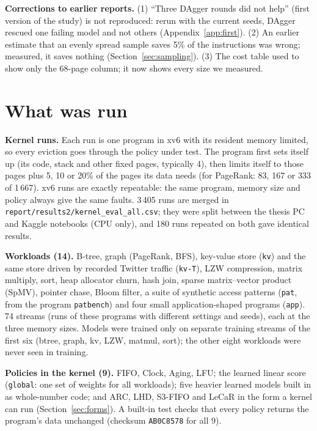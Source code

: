 \documentclass[10.5pt,a4paper]{article}
\newcommand{\code}[1]{\texttt{#1}}
\begin{document}
\textbf{Corrections to earlier reports.} (1) ``Three DAgger rounds did not help'' (first version of the study) is not reproduced: rerun with the current seeds, DAgger rescued one failing model and not
others (Appendix~\ref{app:first}). (2) An earlier estimate that an evenly spread sample saves 5\% of the instructions was wrong; measured, it saves nothing (Section~\ref{sec:sampling}).
(3) The cost table used to show only the 68-page column; it now shows every size we measured.

\section{What was run}
\label{sec:setup}

\textbf{Kernel runs.} Each run is one program in xv6 with its resident memory limited, so every eviction goes through the policy under test. The program first sets itself up (its code, stack
and other fixed pages, typically 4), then limits itself to those pages plus 5, 10 or 20\% of the pages its data needs (for PageRank: 83, 167 or 333 of 1\,667). xv6 runs are exactly repeatable:
the same program, memory size and policy always give the same faults. 3\,405 runs are merged in \code{report/results2/kernel\_eval\_all.csv}; they were split between the thesis PC and
Kaggle notebooks (CPU only), and 180 runs repeated on both gave identical results.

\textbf{Workloads (14).} B-tree, graph (PageRank, BFS), key-value store (\code{kv}) and the same store driven by recorded Twitter traffic (\code{kv-T}), LZW compression, matrix multiply, sort,
heap allocator churn, hash join, sparse matrix--vector product (SpMV), pointer chase, Bloom filter, a suite of synthetic access patterns (\code{pat}, from the program \code{patbench}) and four
small application-shaped programs (\code{app}). 74 streams (runs of these programs with different settings and seeds), each at the three memory sizes. Models were trained only on separate
training streams of the first six (btree, graph, kv, LZW, matmul, sort); the other eight workloads were never seen in training.

\textbf{Policies in the kernel (9).} FIFO, Clock, Aging, LFU; the learned linear score (\code{global}: one set of weights for all workloads); five heavier learned models built in as whole-number code;
and ARC, LHD, S3-FIFO and LeCaR in the form a kernel can run (Section~\ref{sec:forms}). A built-in test checks that every policy returns the program's data unchanged (checksum \code{AB0C8578} for all 9).
\end{document}
